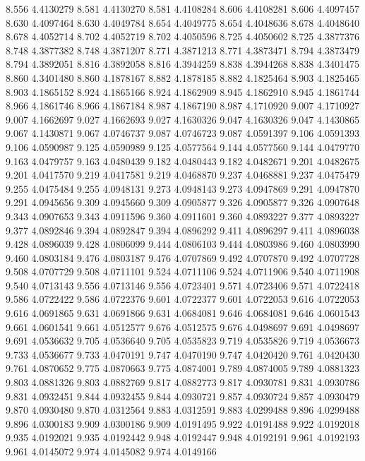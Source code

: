 8.556 4.4130279
8.581 4.4130270
8.581 4.4108284
8.606 4.4108281
8.606 4.4097457
8.630 4.4097464
8.630 4.4049784
8.654 4.4049775
8.654 4.4048636
8.678 4.4048640
8.678 4.4052714
8.702 4.4052719
8.702 4.4050596
8.725 4.4050602
8.725 4.3877376
8.748 4.3877382
8.748 4.3871207
8.771 4.3871213
8.771 4.3873471
8.794 4.3873479
8.794 4.3892051
8.816 4.3892058
8.816 4.3944259
8.838 4.3944268
8.838 4.3401475
8.860 4.3401480
8.860 4.1878167
8.882 4.1878185
8.882 4.1825464
8.903 4.1825465
8.903 4.1865152
8.924 4.1865166
8.924 4.1862909
8.945 4.1862910
8.945 4.1861744
8.966 4.1861746
8.966 4.1867184
8.987 4.1867190
8.987 4.1710920
9.007 4.1710927
9.007 4.1662697
9.027 4.1662693
9.027 4.1630326
9.047 4.1630326
9.047 4.1430865
9.067 4.1430871
9.067 4.0746737
9.087 4.0746723
9.087 4.0591397
9.106 4.0591393
9.106 4.0590987
9.125 4.0590989
9.125 4.0577564
9.144 4.0577560
9.144 4.0479770
9.163 4.0479757
9.163 4.0480439
9.182 4.0480443
9.182 4.0482671
9.201 4.0482675
9.201 4.0417570
9.219 4.0417581
9.219 4.0468870
9.237 4.0468881
9.237 4.0475479
9.255 4.0475484
9.255 4.0948131
9.273 4.0948143
9.273 4.0947869
9.291 4.0947870
9.291 4.0945656
9.309 4.0945660
9.309 4.0905877
9.326 4.0905877
9.326 4.0907648
9.343 4.0907653
9.343 4.0911596
9.360 4.0911601
9.360 4.0893227
9.377 4.0893227
9.377 4.0892846
9.394 4.0892847
9.394 4.0896292
9.411 4.0896297
9.411 4.0896038
9.428 4.0896039
9.428 4.0806099
9.444 4.0806103
9.444 4.0803986
9.460 4.0803990
9.460 4.0803184
9.476 4.0803187
9.476 4.0707869
9.492 4.0707870
9.492 4.0707728
9.508 4.0707729
9.508 4.0711101
9.524 4.0711106
9.524 4.0711906
9.540 4.0711908
9.540 4.0713143
9.556 4.0713146
9.556 4.0723401
9.571 4.0723406
9.571 4.0722418
9.586 4.0722422
9.586 4.0722376
9.601 4.0722377
9.601 4.0722053
9.616 4.0722053
9.616 4.0691865
9.631 4.0691866
9.631 4.0684081
9.646 4.0684081
9.646 4.0601543
9.661 4.0601541
9.661 4.0512577
9.676 4.0512575
9.676 4.0498697
9.691 4.0498697
9.691 4.0536632
9.705 4.0536640
9.705 4.0535823
9.719 4.0535826
9.719 4.0536673
9.733 4.0536677
9.733 4.0470191
9.747 4.0470190
9.747 4.0420420
9.761 4.0420430
9.761 4.0870652
9.775 4.0870663
9.775 4.0874001
9.789 4.0874005
9.789 4.0881323
9.803 4.0881326
9.803 4.0882769
9.817 4.0882773
9.817 4.0930781
9.831 4.0930786
9.831 4.0932451
9.844 4.0932455
9.844 4.0930721
9.857 4.0930724
9.857 4.0930479
9.870 4.0930480
9.870 4.0312564
9.883 4.0312591
9.883 4.0299488
9.896 4.0299488
9.896 4.0300183
9.909 4.0300186
9.909 4.0191495
9.922 4.0191488
9.922 4.0192018
9.935 4.0192021
9.935 4.0192442
9.948 4.0192447
9.948 4.0192191
9.961 4.0192193
9.961 4.0145072
9.974 4.0145082
9.974 4.0149166
